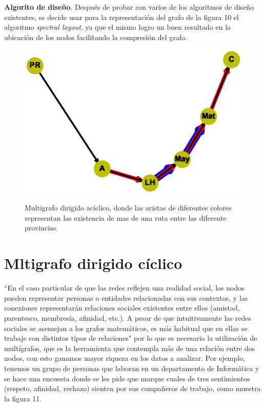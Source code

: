 \documentclass{article}
\begin{document}
\textbf{Algorito de diseño}.\linebreak
Después de probar con varios de los algoritmos de diseño existentes, se decide usar para la representación del grafo de la figura 10 el algoritmo \textit{spectral layout}, ya que el mismo logro un buen resultado en la ubicación de los nodos facilitando la compresión del grafo.
\begin{center}

\end{center}
\begin{figure}[h]
\begin{center}
\includegraphics[scale=0.7]{Graf10_spectral_layout.eps}\\
\caption{Multigrafo dirigido acíclico, donde las aristas de diferentes colores representan las existencia de mas de una ruta entre las diferente provincias.}
\end{center}
\end{figure}
\newpage
\section{Mltigrafo dirigido cíclico}
“En el caso particular de que las redes reflejen una realidad social, los nodos pueden representar personas o entidades relacionadas con sus contextos, y las conexiones representarán relaciones sociales existentes entre ellos (amistad, parentesco, membresía, afinidad, etc.). A pesar de que intuitivamente las redes sociales se asemejan a los grafos matemáticos, es más habitual que en ellas se trabaje con distintos tipos de relaciones"\cite{gf3} por lo que es necesario la utilización de multígrafos, que es la herramienta que contempla más de una relación entre dos nodos, con esto ganamos mayor riqueza en los datos a analizar.\linebreak 
Por ejemplo, tenemos un grupo de personas que laboran en un departamento de Informática y se hace una encuesta donde se les pide que marque cuales de tres sentimientos (respeto, afinidad, rechazo) sienten por sus compañeros de trabajo, como muestra la figura 11.\linebreak
\end{document}

